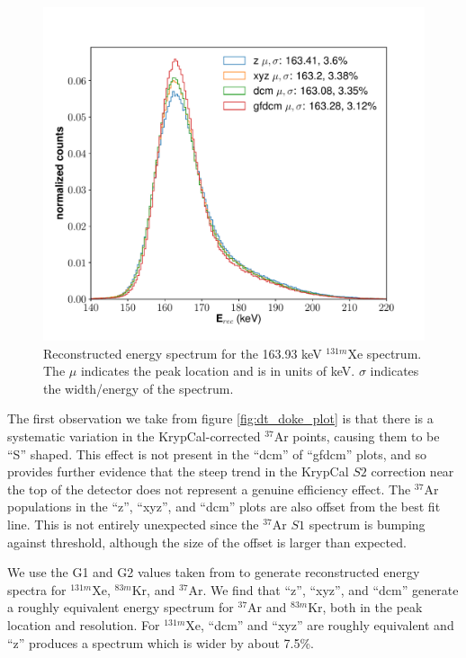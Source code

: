 {\begin{figure}[h!]
  \includegraphics[width=\textwidth]{Figures/E_spec_Xe.pdf}
  \caption{Reconstructed energy spectrum for the 163.93 keV $^{131m}$Xe spectrum. The $\mu$ indicates the peak location and is in units of keV. $\sigma$ indicates the width/energy of the spectrum.}
\label{fig:E_spec_Xe} 
\end{figure}

The first observation we take from figure \ref{fig:dt_doke_plot} is that there is a systematic variation in the KrypCal-corrected $^{37}$Ar points, causing them to be ``S'' shaped. This effect is not present in the ``dcm'' of ``gfdcm'' plots, and so provides further evidence that the steep trend in the KrypCal $S2$ correction near the top of the detector does not represent a genuine efficiency effect. The $^{37}$Ar populations in the ``z'', ``xyz'', and ``dcm'' plots are also offset from the best fit line. This is not entirely unexpected since the $^{37}$Ar $S1$ spectrum is bumping against threshold, although the size of the offset is larger than expected.

We use the G1 and G2 values taken from to generate reconstructed energy spectra for $^{131m}$Xe, $^{83m}$Kr, and $^{37}$Ar. We find that ``z'', ``xyz'', and ``dcm'' generate a roughly equivalent energy spectrum for $^{37}$Ar and $^{83m}$Kr, both in the peak location and resolution. For $^{131m}$Xe, ``dcm'' and ``xyz'' are roughly equivalent and ``z'' produces a spectrum which is wider by about 7.5\%. 

}
